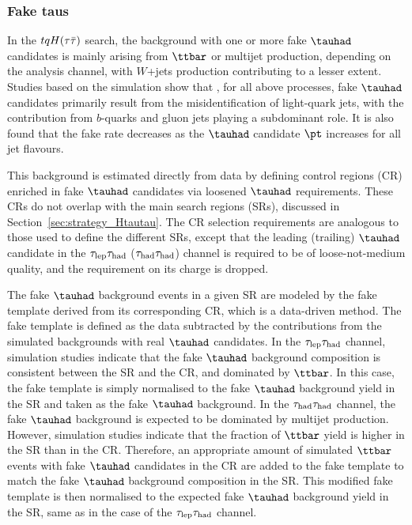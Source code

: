 \subsubsection{Fake taus}
\label{sec:faketaus}
In the $tqH(\tau\bar{\tau})$ search, the background with one or more fake $\tauhad$ candidates is mainly arising from $\ttbar$ or
multijet production, depending on the analysis channel, with $W$+jets production contributing to a lesser extent. 
Studies based on the simulation show that , for all above processes, fake $\tauhad$ candidates primarily result from the 
misidentification of light-quark jets, with the contribution from $b$-quarks and gluon jets playing a subdominant role.
It is also found that the fake rate decreases as the $\tauhad$ candidate $\pt$ increases for all jet flavours.

This background is estimated directly from data by defining control regions (CR) enriched in fake $\tauhad$ candidates via loosened $\tauhad$ requirements. These CRs do not overlap with the main search regions (SRs), discussed in Section~\ref{sec:strategy_Htautau}. The CR selection requirements are analogous to those used to define the different SRs, except that the leading (trailing) $\tauhad$ candidate 
in the $\tau_{\mathrm{lep}} \tau_{\mathrm{had}}$ ($\tau_{\mathrm{had}} \tau_{\mathrm{had}}$) channel is required to be of loose-not-medium quality, and the requirement on its charge is dropped.

The fake $\tauhad$ background events in a given SR are modeled by the fake template derived from its corresponding CR, which is a data-driven method. The fake template is defined as the data subtracted by the contributions from the simulated backgrounds with real $\tauhad$ candidates. In the $\tau_{\mathrm{lep}} \tau_{\mathrm{had}}$ channel, simulation studies indicate that the fake $\tauhad$ background composition is consistent between the SR and the CR, and dominated by $\ttbar$. In this case, the fake template is simply normalised to the fake $\tauhad$ background yield in the SR and taken as the fake $\tauhad$ background. In the $\tau_{\mathrm{had}} \tau_{\mathrm{had}}$ channel, the fake $\tauhad$ background is expected to be dominated by multijet production. However, simulation studies indicate that the fraction of $\ttbar$ yield is higher in the SR than in the CR. Therefore, an appropriate amount of simulated $\ttbar$ events with fake $\tauhad$ candidates in the CR are added to the fake template to match the fake $\tauhad$ background composition in the SR. This modified fake template is then normalised to the expected fake $\tauhad$ background yield in the SR, same as in the case of the $\tau_{\mathrm{lep}} \tau_{\mathrm{had}}$ channel.

